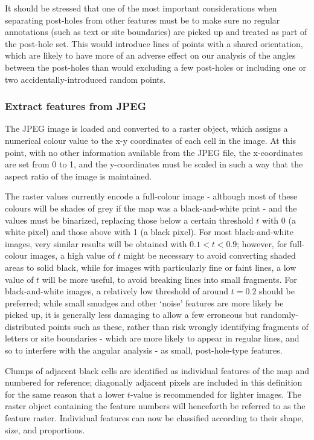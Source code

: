 \documentclass[../../ArchStats.tex]{subfiles}
\begin{document}
It should be stressed that one of the most important considerations when separating post-holes from other features must be to make sure no regular annotations (such as text or site boundaries) are picked up and treated as part of the post-hole set. This would introduce lines of points with a shared orientation, which are likely to have more of an adverse effect on our analysis of the angles between the post-holes than would excluding a few post-holes or including one or two accidentally-introduced random points. 

\subsubsection{Extract features from JPEG}

The JPEG image is loaded and converted to a raster object, which assigns a numerical colour value to the x-y coordinates of each cell in the image. At this point, with no other information available from the JPEG file, the x-coordinates are set from 0 to 1, and the y-coordinates must be scaled in such a way that the aspect ratio of the image is maintained.

The raster values currently encode a full-colour image - although most of these colours will be shades of grey if the map was a black-and-white print - and the values must be binarized, replacing those below a certain threshold $t$ with 0 (a white pixel) and those above with 1 (a black pixel). For most black-and-white images, very similar results will be obtained with $0.1 < t < 0.9$; however, for full-colour images, a high value of $t$ might be necessary to avoid converting shaded areas to solid black, while for images with particularly fine or faint lines, a low value of $t$ will be more useful, to avoid  breaking lines into small fragments. For black-and-white images, a relatively low threshold of around $t = 0.2$ should be preferred; while small smudges and other `noise' features are more likely be picked up, it is generally less damaging  to allow a few erroneous but randomly-distributed points such as these, rather than risk wrongly identifying fragments of letters or site boundaries - which are more likely to appear in regular lines, and so to interfere with the angular analysis - as small, post-hole-type features.

Clumps of adjacent black cells are identified as individual features of the map and numbered for reference; diagonally adjacent pixels are included in this definition for the same reason that a lower $t$-value is recommended for lighter images. The raster object containing the feature numbers will henceforth be referred to as the feature raster. Individual features can now be classified according to their shape, size, and proportions.
\end{document}

